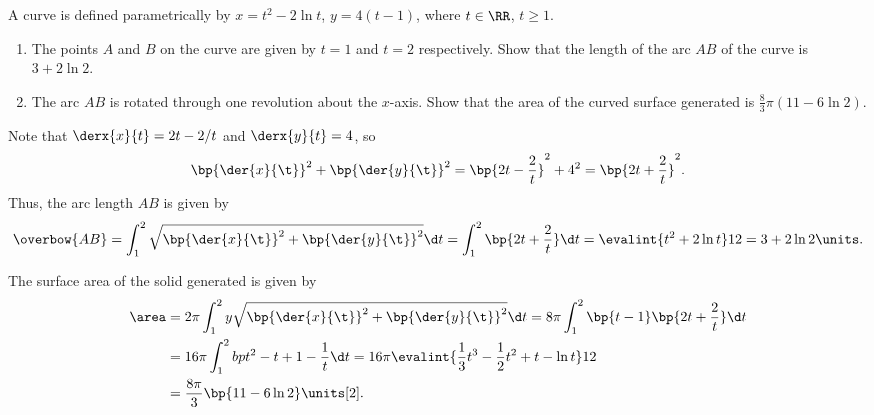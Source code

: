 \begin{problem}
    A curve is defined parametrically by $x=t^{2}-2\ln t$, $y=4(t-1)$, where $t\in\RR$, $t\geq1$.

    \begin{enumerate}
        \item The points $A$ and $B$ on the curve are given by $t=1$ and $t=2$ respectively. Show that the length of the arc $AB$ of the curve is $3+2\ln2$.
        \item The arc $AB$ is rotated through one revolution about the $x$-axis. Show that the area of the curved surface generated is $\frac83 \pi (11 - 6\ln2)$.
    \end{enumerate}
\end{problem}
\begin{solution}
    \begin{ppart}
        Note that $\derx{x}{t} = 2t - 2/t$ and $\derx{y}{t} = 4$, so \[\bp{\der{x}{\t}}^2 + \bp{\der{y}{\t}}^2 = \bp{2t - \frac2t}^2 + 4^2 = \bp{2t + \frac2t}^2.\] Thus, the arc length $AB$ is given by \[\overbow{AB} = \int_1^2 \sqrt{\bp{\der{x}{\t}}^2 + \bp{\der{y}{\t}}^2} \d t = \int_1^2 \bp{2t + \frac2t} \d t = \evalint{t^2 + 2\ln t}12 = 3 + 2\ln 2 \units.\]
    \end{ppart}
    \begin{ppart}
        The surface area of the solid generated is given by
        \begin{align*}
            \area &= 2\pi \int_1^2 y \sqrt{\bp{\der{x}{\t}}^2 + \bp{\der{y}{\t}}^2} \d t = 8\pi \int_1^2 \bp{t-1} \bp{2t + \frac2t} \d t\\
            &= 16\pi \int_1^2 bp{t^2 - t + 1 - \frac1t} \d t = 16\pi \evalint{\frac13 t^3 - \frac12 t^2 + t - \ln t}12\\
            &= \frac{8\pi}{3} \bp{11 - 6 \ln 2} \units[2].
        \end{align*}
    \end{ppart}
\end{solution}

